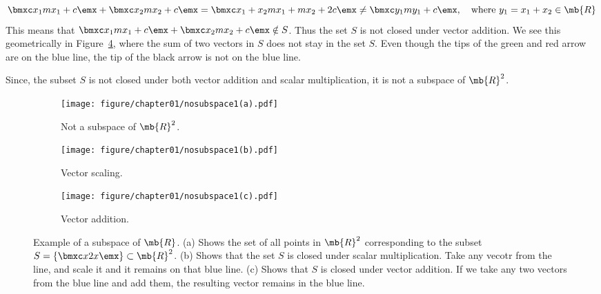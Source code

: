 \begin{boxedstuff}
\begin{example}
\begin{enumerate}
        \[ \bmxc x_1 \\ m x_1 + c\emx + \bmxc x_2 \\ m x_2 + c\emx = \bmxc x_1 + x_2 \\ m x_1 + m x_2 + 2c \emx \neq \bmxc y_1 \\ m y_1 + c\emx, \quad \text{where} \,\, y_1 = x_1 + x_2 \in \mb{R} \]
        This means that $\bmxc x_1 \\ m x_1 + c\emx + \bmxc x_2 \\ m x_2 + c\emx \notin S$. Thus the set $S$ is not closed under vector addition. We see this geometrically in Figure~\ref{fig:ch01-nosubspace1-addition}, where the sum of two vectors in $S$ does not stay in the set $S$. Even though the tips of the green and red arrow are on the blue line, the tip of the black arrow is not on the blue line.
    \end{enumerate}
    Since, the subset $S$ is not closed under both vector addition and scalar multiplication, it is not a subspace of $\mb{R}^2$.
    \label{example:nosubspace-straight-line}
\end{example}
\end{boxedstuff}
\begin{figure}[h]
    \centering
    \begin{subfigure}[b]{0.32\textwidth}
        \texttt{[image: figure/chapter01/nosubspace1(a).pdf]}
        \caption{Not a subspace of $\mb{R}^2$.}
        \label{fig:ch01-nosubspace1}
    \end{subfigure}
    \begin{subfigure}[b]{0.32\textwidth}
        \centering
        \texttt{[image: figure/chapter01/nosubspace1(b).pdf]}
        \caption{Vector scaling.}
        \label{fig:ch01-nosubspace1-scale}
    \end{subfigure}
    \begin{subfigure}[b]{0.32\textwidth}
        \centering
        \texttt{[image: figure/chapter01/nosubspace1(c).pdf]}
        \caption{Vector addition.}
        \label{fig:ch01-nosubspace1-addition}
    \end{subfigure}
    \caption{Example of a subspace of $\mb{R}$. (a) Shows the set of all points in $\mb{R}^2$ corresponding to the subset $S = \left\{ \bmxc x \\ 2 x\emx\right\} \subset \mb{R}^2$. (b) Shows that the set $S$ is closed under scalar multiplication. Take any vecotr from the line, and scale it and it remains on that blue line. (c) Shows that $S$ is closed under vector addition. If we take any two vectors from the blue line and add them, the resulting vector remains in the blue line.}
\end{figure}

